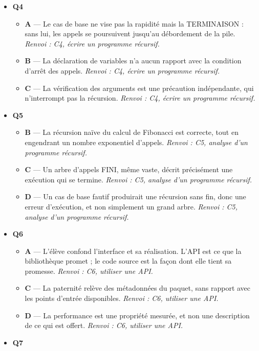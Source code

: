 \begin{itemize}
\begin{itemize}
  \end{itemize}
  \item \textbf{Q4}
  \begin{itemize}
    \item \textbf{A} — Le cas de base ne vise pas la rapidité mais la TERMINAISON : sans lui, les appels se poursuivent jusqu'au débordement de la pile. \emph{Renvoi : C4, écrire un programme récursif.}
    \item \textbf{B} — La déclaration de variables n'a aucun rapport avec la condition d'arrêt des appels. \emph{Renvoi : C4, écrire un programme récursif.}
    \item \textbf{C} — La vérification des arguments est une précaution indépendante, qui n'interrompt pas la récursion. \emph{Renvoi : C4, écrire un programme récursif.}
  \end{itemize}
  \item \textbf{Q5}
  \begin{itemize}
    \item \textbf{B} — La récursion naïve du calcul de Fibonacci est correcte, tout en engendrant un nombre exponentiel d'appels. \emph{Renvoi : C5, analyse d'un programme récursif.}
    \item \textbf{C} — Un arbre d'appels FINI, même vaste, décrit précisément une exécution qui se termine. \emph{Renvoi : C5, analyse d'un programme récursif.}
    \item \textbf{D} — Un cas de base fautif produirait une récursion sans fin, donc une erreur d'exécution, et non simplement un grand arbre. \emph{Renvoi : C5, analyse d'un programme récursif.}
  \end{itemize}
  \item \textbf{Q6}
  \begin{itemize}
    \item \textbf{A} — L'élève confond l'interface et sa réalisation. L'API est ce que la bibliothèque promet ; le code source est la façon dont elle tient sa promesse. \emph{Renvoi : C6, utiliser une API.}
    \item \textbf{C} — La paternité relève des métadonnées du paquet, sans rapport avec les points d'entrée disponibles. \emph{Renvoi : C6, utiliser une API.}
    \item \textbf{D} — La performance est une propriété mesurée, et non une description de ce qui est offert. \emph{Renvoi : C6, utiliser une API.}
  \end{itemize}
  \item \textbf{Q7}
  \begin{itemize}

\end{itemize}
\end{itemize}
